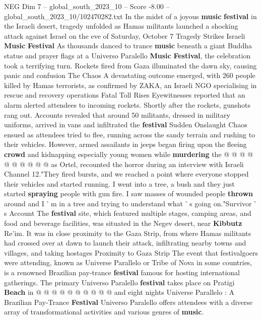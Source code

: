 \begin{textsample}{NEG Dim 7 – global\_south\_2023\_10 – Score -8.00 – global\_south\_2023\_10/102470282.txt}  \label{ex:f7_neg_315}
In the midst of a joyous \textbf{music} \textbf{festival} in the Israeli desert, tragedy unfolded as Hamas militants launched a shocking attack against Israel on the eve of Saturday, October 7 Tragedy Strikes Israeli \textbf{Music} \textbf{Festival} As thousands danced to trance \textbf{music} beneath a giant Buddha statue and prayer flags at a Universo Paralello \textbf{Music} \textbf{Festival}, the celebration took a terrifying turn.
Rockets fired from Gaza illuminated the dawn sky, causing panic and confusion The Chaos A devastating outcome emerged, with 260 people killed by Hamas terrorists, as confirmed by ZAKA, an Israeli NGO specialising in rescue and recovery operations Fatal Toll Rises Eyewitnesses reported that an alarm alerted attendees to incoming rockets.
Shortly after the rockets, gunshots rang out.
Accounts revealed that around 50 militants, dressed in military uniforms, arrived in vans and infiltrated the \textbf{festival} Sudden Onslaught Chaos ensued as attendees tried to flee, running across the sandy terrain and rushing to their vehicles.
However, armed assailants in jeeps began firing upon the fleeing \textbf{crowd} and kidnapping especially young women while \textbf{murdering} the @ @ @ @ @ @ @ @ @ @ as Ortel, recounted the horror during an interview with Israeli Channel 12."They fired bursts, and we reached a point where everyone stopped their vehicles and started running.
I went into a tree, a bush and they just started \textbf{spraying} people with gun fire.
I saw masses of wounded people \textbf{thrown} around and I ' m in a tree and trying to understand what ' s going on."Survivor ' s Account The \textbf{festival} site, which featured multiple stages, camping areas, and food and beverage facilities, was situated in the Negev desert, near \textbf{Kibbutz} Re'im.
It was in close proximity to the Gaza Strip, from where Hamas militants had crossed over at dawn to launch their attack, infiltrating nearby towns and villages, and taking hostages Proximity to Gaza Strip The event that festivalgoers were attending, known as Universe Parallelo or Tribe of Nova in some countries, is a renowned Brazilian pay-trance \textbf{festival} famous for hosting international gatherings.
The primary Universo Paralello \textbf{festival} takes place on Pratigi \textbf{Beach} in @ @ @ @ @ @ @ @ @ @ and eight nights Universe Parallelo : A Brazilian Pay-Trance \textbf{Festival} Universo Paralello offers attendees with a diverse array of transformational activities and various genres of \textbf{music}.

\end{textsample}
